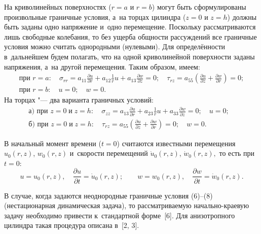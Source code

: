 На криволинейных поверхностях ($r = a$ и  $r = b$) могут быть сформулированы произвольные 
граничные условия, а~на торцах цилиндра ($z = 0$ и $z = h$) должны быть заданы одно 
напряжение и~одно перемещение. Поскольку рассматриваются лишь свободные 
колебания, то без ущерба общности рассуждений все граничные условия можно 
считать однородными (нулевыми). Для определённости в~дальнейшем будем 
полагать, что на одной криволинейной поверхности заданы напряжения, а~на 
другой перемещения.
Таким образом, имеем:
\begin{equation}
 \begin{array}{l}
\displaystyle
\text{при } r = a:\quad  \sigma _{rr} = a_{11} \frac{\partial u}{\partial r} + a_{12} 
\frac{1}{r}u + a_{13} \frac{\partial w}{\partial z} = 0; \quad 
\tau _{rz} = a_{55} \left( {\frac{\partial u}{\partial z} + \frac{\partial w}{\partial r}} 
\right) = 0;
\\\displaystyle
\text{при } r = b:\quad  u = 0;\quad w = 0.
\end{array}
\end{equation}
На торцах "--- два варианта граничных условий:
\begin{gather}
\text{а) при } z = 0\; \text{и}\; z=h:\quad  
\sigma _{zz} = a_{13} \frac{\partial u}{\partial r} + a_{23} \frac{1}{r}u + a_{33} \frac{\partial w}{\partial z} = 0;
\quad u = 0;\;\;
\\ 
\text{б) при } z = 0\; \text{и}\; z=h:\quad  
\tau _{rz} = a_{55} \left( {\frac{\partial u}{\partial z} + \frac{\partial w}{\partial r}} \right) = 0;\quad w = 0 .\qquad
\qquad
\end{gather}

В начальный момент времени ($t = 0$) считаются известными перемещения $u_0\left( {r,z} \right)$, 
$w_0 \left( {r,z} \right)$ и~скорости перемещений ${\dot u_0 }\left( {r,z} \right)$, ${\dot w_0 }\left( {r,z} \right),$ то есть при $t = 0$:
\begin{equation}
u = u_0 \left( {r,z} \right),\quad \frac{\partial u}{\partial t} = 
{\dot u_0 }\left( {r,z} \right); \qquad w = w_0 \left( {r,z} \right),\quad 
\frac{\partial w}{\partial t} = 
{\dot w_0 \left( {r,z} \right)}.
\end{equation}

\begin{remark}[1]В случае, когда задаются неоднородные граничные условия {\rm (6)--(8)} 
{\rm (}нестационарная ди\-на\-ми\-чес\-кая задача{\rm )}, то рассматриваемую начально-краевую 
задачу необходимо привести к~стандартной форме~{\rm [6]}. Для анизотропного 
цилиндра такая процедура описана в~{\rm [2, 3]}.
\end{remark}
\smallskip

